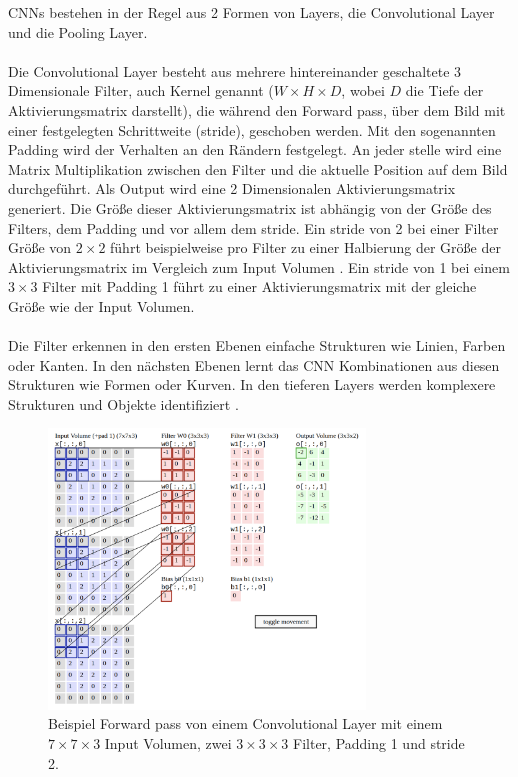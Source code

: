 \gls{CNN}s bestehen in der Regel aus 2 Formen von \gls{Layer}s, die Convolutional \gls{Layer} und die Pooling Layer. 
\\
\\
Die Convolutional \gls{Layer} besteht aus mehrere hintereinander geschaltete 3 Dimensionale
Filter, auch Kernel genannt ($ W \times H \times D$, wobei $D$ die Tiefe der Aktivierungsmatrix darstellt), die während den Forward pass, über dem Bild 
mit einer festgelegten Schrittweite (\gls{stride}), geschoben werden. Mit den sogenannten Padding wird der Verhalten an den Rändern festgelegt.
An jeder stelle wird eine Matrix Multiplikation zwischen den Filter und die aktuelle Position auf dem Bild durchgeführt. 
Als Output wird eine 2 Dimensionalen Aktivierungsmatrix generiert. Die Größe dieser Aktivierungsmatrix ist abhängig 
von der Größe des Filters, dem Padding und vor allem dem \gls{stride}. Ein \gls{stride} von 2 bei einer Filter Größe von $ 2\times2 $ führt beispielweise 
pro Filter zu einer Halbierung der Größe der Aktivierungsmatrix im Vergleich zum Input Volumen \cite{aufbau-funktion-convnet}.
Ein \gls{stride} von 1 bei einem $ 3\times3 $ Filter mit Padding 1 führt zu einer Aktivierungsmatrix mit der gleiche Größe wie der Input Volumen.
\\
\\
Die Filter erkennen in den ersten Ebenen einfache Strukturen wie Linien, Farben oder Kanten. In den nächsten Ebenen lernt das CNN Kombinationen aus 
diesen Strukturen wie Formen oder Kurven. In den tieferen \gls{Layer}s werden komplexere Strukturen und Objekte identifiziert \cite{convnet-erklaerung}. 

\begin{figure}[H]
  \centering
  \includegraphics[width=0.75\textwidth]{resources/cnn/funktion-cnn.png}
  \caption{
    Beispiel Forward pass von einem Convolutional \gls{Layer} mit einem $ 7\times7\times3 $ Input Volumen, zwei $3\times3\times3$ Filter, 
    Padding 1 und \gls{stride} 2.
    \cite{convnet-demo}
  }
  \label{image:convnet-demo}
\end{figure}

